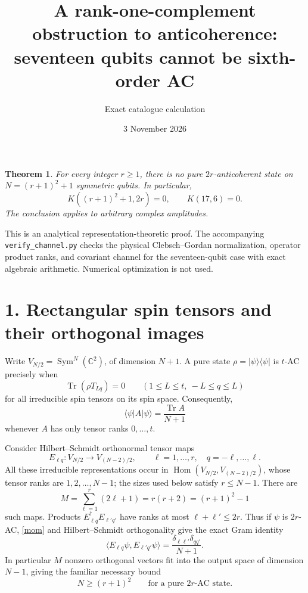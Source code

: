 \documentclass[11pt]{article}
\newtheorem{theorem}{Theorem}
\newcommand{\Tr}{\operatorname{Tr}}
\begin{document}
\title{A rank-one-complement obstruction to anticoherence:\\seventeen qubits cannot be sixth-order AC}
\author{Exact catalogue calculation}
\date{3 November 2026}
\maketitle
\begin{theorem}\label{thm}
For every integer $r\ge1$, there is no pure $2r$-anticoherent state on
$N=(r+1)^2+1$ symmetric qubits. In particular,
\[
 \boxed{K((r+1)^2+1,2r)=0,\qquad K(17,6)=0.}
\]
The conclusion applies to arbitrary complex amplitudes.
\end{theorem}
This is an analytical representation-theoretic proof. The accompanying
\texttt{verify\_channel.py} checks the physical Clebsch--Gordan normalization,
operator product ranks, and covariant channel for the seventeen-qubit case
with exact algebraic arithmetic. Numerical optimization is not used.

\section*{1. Rectangular spin tensors and their orthogonal images}
Write $V_{N/2}=\operatorname{Sym}^N(\mathbb C^2)$, of dimension $N+1$.
A pure state $\rho=|\psi\rangle\langle\psi|$ is $t$-AC precisely when
\[
 \Tr(\rho T_{Lq})=0\qquad(1\le L\le t,\ -L\le q\le L)
\]
for all irreducible spin tensors on its spin space. Consequently,
\begin{equation}\label{mom}
 \langle\psi|A|\psi\rangle=\frac{\Tr A}{N+1}
\end{equation}
whenever $A$ has only tensor ranks $0,\ldots,t$.

Consider Hilbert--Schmidt orthonormal tensor maps
\[
 E_{\ell q}:V_{N/2}\longrightarrow V_{(N-2)/2},
 \qquad \ell=1,\ldots,r,\quad q=-\ell,\ldots,\ell.
\]
All these irreducible representations occur in
$\operatorname{Hom}(V_{N/2},V_{(N-2)/2})$, whose tensor ranks are
$1,2,\ldots,N-1$; the sizes used below satisfy $r\le N-1$.
There are
\[
 M=\sum_{\ell=1}^{r}(2\ell+1)=r(r+2)=(r+1)^2-1
\]
such maps. Products $E_{\ell q}^{\dagger}E_{\ell' q'}$ have ranks at most
$\ell+\ell'\le2r$. Thus if $\psi$ is $2r$-AC, \eqref{mom} and
Hilbert--Schmidt orthogonality give the exact Gram identity
\begin{equation}\label{gram}
 \langle E_{\ell q}\psi,E_{\ell' q'}\psi\rangle
 =\frac{\delta_{\ell\ell'}\delta_{qq'}}{N+1}.
\end{equation}
In particular $M$ nonzero orthogonal vectors fit into the output space of
dimension $N-1$, giving the familiar necessary bound
\begin{equation}\label{bound}
 \boxed{N\ge(r+1)^2}\qquad\text{for a pure $2r$-AC state.}
\end{equation}
\end{document}

